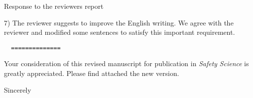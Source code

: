 \documentclass[a4paper,12pt]{letter}
\begin{document}
\begin{letter}{Response to the reviewers report}
{7) The reviewer suggests to improve the English writing. We agree with the reviewer and modified some sentences to satisfy this important requirement.  \\

\begin{verbatim}
  ==============
\end{verbatim}

}

Your consideration of this revised manuscript for publication in 
\textit{Safety Science} is greatly appreciated. 
Please find attached the new version. \\


\closing{Sincerely}


\end{letter}
\end{document}

